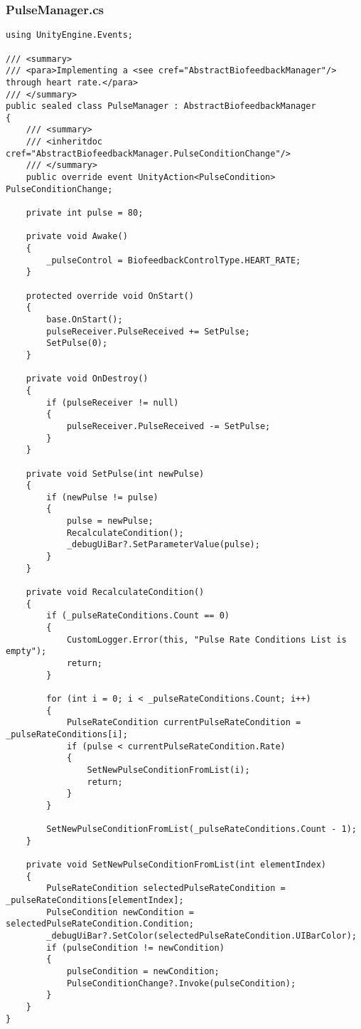 \subsubsection*{PulseManager.cs}
\begin{verbatim}
using UnityEngine.Events;

/// <summary>
/// <para>Implementing a <see cref="AbstractBiofeedbackManager"/> through heart rate.</para>
/// </summary>
public sealed class PulseManager : AbstractBiofeedbackManager
{
    /// <summary>
    /// <inheritdoc cref="AbstractBiofeedbackManager.PulseConditionChange"/>
    /// </summary>
    public override event UnityAction<PulseCondition> PulseConditionChange;

    private int pulse = 80;

    private void Awake()
    {
        _pulseControl = BiofeedbackControlType.HEART_RATE;
    }

    protected override void OnStart()
    {
        base.OnStart();
        pulseReceiver.PulseReceived += SetPulse;
        SetPulse(0);
    }

    private void OnDestroy()
    {
        if (pulseReceiver != null)
        {
            pulseReceiver.PulseReceived -= SetPulse;
        }
    }

    private void SetPulse(int newPulse)
    {
        if (newPulse != pulse)
        {
            pulse = newPulse;
            RecalculateCondition();
            _debugUiBar?.SetParameterValue(pulse);
        }
    }

    private void RecalculateCondition()
    {
        if (_pulseRateConditions.Count == 0)
        {
            CustomLogger.Error(this, "Pulse Rate Conditions List is empty");
            return;
        }

        for (int i = 0; i < _pulseRateConditions.Count; i++)
        {
            PulseRateCondition currentPulseRateCondition = _pulseRateConditions[i];
            if (pulse < currentPulseRateCondition.Rate)
            {
                SetNewPulseConditionFromList(i);
                return;
            }
        }

        SetNewPulseConditionFromList(_pulseRateConditions.Count - 1);
    }

    private void SetNewPulseConditionFromList(int elementIndex)
    {
        PulseRateCondition selectedPulseRateCondition = _pulseRateConditions[elementIndex];
        PulseCondition newCondition = selectedPulseRateCondition.Condition;
        _debugUiBar?.SetColor(selectedPulseRateCondition.UIBarColor);
        if (pulseCondition != newCondition)
        {
            pulseCondition = newCondition;
            PulseConditionChange?.Invoke(pulseCondition);
        }
    }
}
\end{verbatim}
